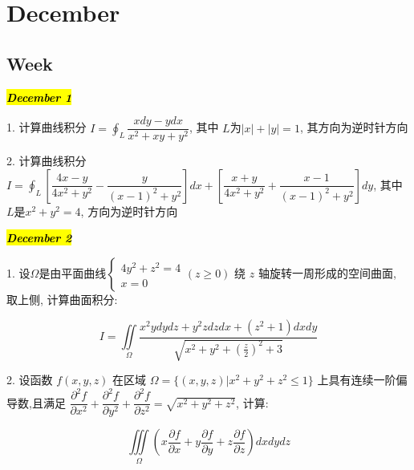 \chapter{December}
\section{Week }
\hl{\textbf{\textit{December 1}}}

1. 计算曲线积分 $\displaystyle{I=\oint_{L}\dfrac{xdy-ydx}{x^{2}+xy+y^{2}}}$, 其中 $L$为$|x|+|y|=1$, 其方向为逆时针方向
\begin{solution}
	
\end{solution}

2. 计算曲线积分 $\displaystyle{I=\oint_{L}\left[\dfrac{4x-y}{4x^{2}+y^{2}}-\dfrac{y}{(x-1)^{2}+y^{2}} \right]dx+\left[\dfrac{x+y}{4x^{2}+y^{2}}+\dfrac{x-1}{(x-1)^{2}+y^{2}} \right]dy}$,
其中 $L$是$x^{2}+y^{2}=4$, 方向为逆时针方向
\begin{solution}
	
\end{solution}

\hl{\textbf{\textit{December 2}}}

1. 设$\Omega$是由平面曲线$
\begin{cases}
	4y^{2}+z^{2}=4\\
	x=0
\end{cases}(z\geq 0)$ 绕 $z$ 轴旋转一周形成的空间曲面, 取上侧, 计算曲面积分:

$$I=\iint\limits_{\Omega}\dfrac{x^{2}ydydz+y^{2}zdzdx+(z^{2}+1)dxdy}{\sqrt{x^{2}+y^{2}+(\frac{z}{2})^{2}+3}}$$
\begin{solution}
	
\end{solution}

2. 设函数 $f(x,y,z)$ 在区域 $\Omega=\{(x,y,z)|x^{2}+y^{2}+z^{2}\leq 1\}$ 上具有连续一阶偏导数,且满足 $\dfrac{\partial^{2}f}{\partial x^{2}}+\dfrac{\partial^{2}f}{\partial y^{2}}+\dfrac{\partial^{2}f}{\partial z^{2}}=\sqrt{x^{2}+y^{2}+z^{2}}$, 
计算: 

$$\iiint\limits_{\Omega}(x\dfrac{\partial f}{\partial x}+y\dfrac{\partial f}{\partial y}+z\dfrac{\partial f}{\partial z})dxdydz$$
\begin{solution}
	
\end{solution}

